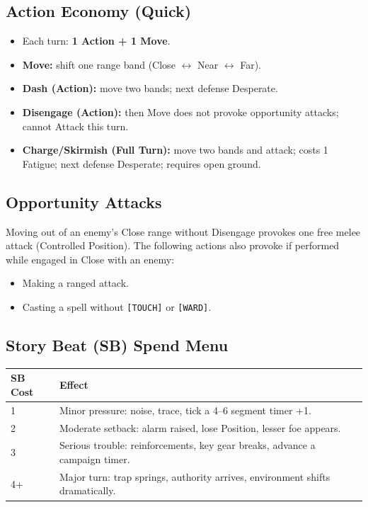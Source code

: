 \subsection{Action Economy (Quick)}

\begin{itemize}
  \item Each turn: \textbf{1 Action + 1 Move}.
  \item \textbf{Move:} shift one range band (Close $\leftrightarrow$ Near $\leftrightarrow$ Far).
  \item \textbf{Dash (Action):} move two bands; next defense Desperate.
  \item \textbf{Disengage (Action):} then Move does not provoke opportunity attacks; cannot Attack this turn.
  \item \textbf{Charge/Skirmish (Full Turn):} move two bands and attack; costs 1 Fatigue; next defense Desperate; requires open ground.
\end{itemize}

\subsection{Opportunity Attacks}

Moving out of an enemy's Close range without Disengage provokes one free melee attack (Controlled Position). The following actions also provoke if performed while engaged in Close with an enemy:
\begin{itemize}
  \item Making a ranged attack.
  \item Casting a spell without \texttt{[TOUCH]} or \texttt{[WARD]}.
\end{itemize}

\subsection{Story Beat (SB) Spend Menu}

\begin{tabular}{@{}ll@{}}
\toprule
\textbf{SB Cost} & \textbf{Effect} \\
\midrule
1 & Minor pressure: noise, trace, tick a 4--6 segment timer +1. \\
2 & Moderate setback: alarm raised, lose Position, lesser foe appears. \\
3 & Serious trouble: reinforcements, key gear breaks, advance a campaign timer. \\
4+ & Major turn: trap springs, authority arrives, environment shifts dramatically. \\
\bottomrule
\end{tabular}

